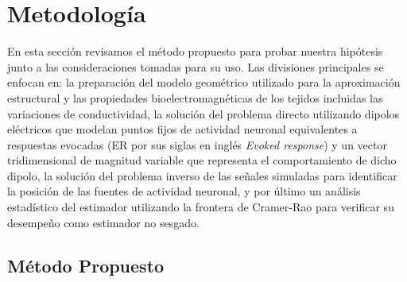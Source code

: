 %
\chapter{Metodología}

\label{sec:methodology}

En esta sección revisamos el método propuesto para probar nuestra hipótesis junto a las consideraciones tomadas para su uso. Las divisiones principales se enfocan en: la preparación del modelo geométrico utilizado para la aproximación estructural y las propiedades bioelectromagnéticas de los tejidos incluidas las variaciones de conductividad, la solución del problema directo utilizando dipolos eléctricos que modelan puntos fijos de actividad neuronal equivalentes a respuestas evocadas (ER por sus siglas en inglés \emph{Evoked response}) y un vector tridimensional de magnitud variable que representa el comportamiento de dicho dipolo, la solución del problema inverso de las señales simuladas para identificar la posición de las fuentes de actividad neuronal, y por último un análisis estadístico del estimador utilizando la frontera de Cramer-Rao para verificar su desempeño como estimador no sesgado.

\section{Método Propuesto}
\label{sec:methodology:method}


